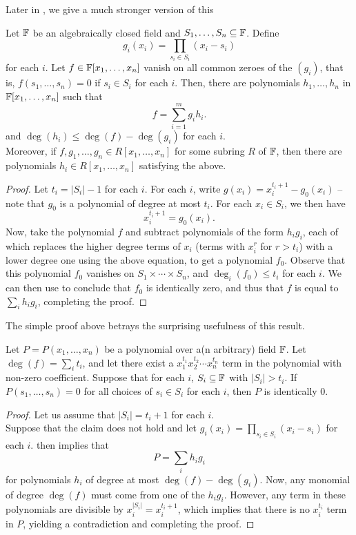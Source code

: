 	Later in , we give a much stronger version of this

	\begin{ftheo}
		\label{thm: comb null}
		Let $\mathbb{F}$ be an algebraically closed field and $S_1,\ldots,S_n \subseteq \mathbb{F}$. Define
		\[ g_i(x_i) = \prod_{s_i \in S_i} (x_i - s_i) \]
		for each $i$. Let $f \in \mathbb{F}[x_1,\ldots,x_n]$ vanish on all common zeroes of the $(g_i)$, that is, $f(s_1,\ldots,s_n) = 0$ if $s_i \in S_i$ for each $i$. Then, there are polynomials $h_1,\ldots,h_n$ in $\mathbb{F}[x_1,\ldots,x_n]$ such that
		\[ f = \sum_{i=1}^{m} g_i h_i. \]
		and $\deg(h_i) \le \deg(f) - \deg(g_i)$ for each $i$.\\
		Moreover, if $f,g_1,\ldots,g_n \in R[x_1,\ldots,x_n]$ for some subring $R$ of $\mathbb{F}$, then there are polynomials $h_i \in R[x_1,\ldots,x_n]$ satisfying the above.
	\end{ftheo}
	\begin{proof}
		Let $t_i = |S_i| - 1$ for each $i$. For each $i$, write $g(x_i) = x_i^{t_i+1} - g_0(x_i)$ -- note that $g_0$ is a polynomial of degree at most $t_i$. For each $x_i \in S_i$, we then have
		\[ x_i^{t_i + 1} = g_0(x_i). \]
		Now, take the polynomial $f$ and subtract polynomials of the form $h_i g_i$, each of which replaces the higher degree terms of $x_i$ (terms with $x_i^{r}$ for $r > t_i$) with a lower degree one using the above equation, to get a polynomial $f_0$. Observe that this polynomial $f_0$ vanishes on $S_1 \times \cdots \times S_n$, and $\deg_i(f_0) \le t_i$ for each $i$. We can then use  to conclude that $f_0$ is identically zero, and thus that $f$ is equal to $\sum_i h_i g_i$, completing the proof.
	\end{proof}

	The simple proof above betrays the surprising usefulness of this result.

	\begin{fcor}
		\label{thm: cube-vanishing}
		Let $P = P(x_1,\ldots,x_n)$ be a polynomial over a(n arbitrary) field $\mathbb{F}$. Let $\deg(f) = \sum_i t_i$, and let there exist a $x_1^{t_1} x_2^{t_2} \cdots x_n^{t_n}$ term in the polynomial with non-zero coefficient. Suppose that for each $i$, $S_i \subseteq \mathbb{F}$ with $|S_i| > t_i$. If $P(s_1,\ldots,s_n) = 0$ for all choices of $s_i \in S_i$ for each $i$, then $P$ is identically $0$. 
	\end{fcor}
	\begin{proof}
		Let us assume that $|S_i| = t_i + 1$ for each $i$.\\
		Suppose that the claim does not hold and let $g_i(x_i) = \prod_{s_i \in S_i} (x_i - s_i)$ for each $i$.  then implies that
		\[ P = \sum_i h_i g_i \]
		for polynomials $h_i$ of degree at most $\deg(f) - \deg(g_i)$. Now, any monomial of degree $\deg(f)$ must come from one of the $h_i g_i$. However, any term in these polynomials are divisible by $x_i^{|S_i|} = x_i^{t_i + 1}$, which implies that there is no $x_i^{t_i}$ term in $P$, yielding a contradiction and completing the proof.
	\end{proof}